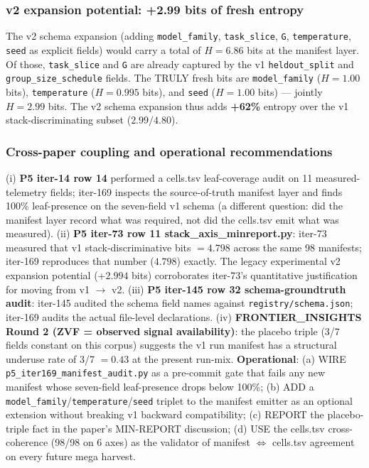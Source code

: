 \subsubsection{v2 expansion potential: +2.99 bits of fresh entropy}
\label{sec:p5-iter169-v2-expansion}

The v2 schema expansion (adding \texttt{model\_family}, \texttt{task\_slice}, \texttt{G}, \texttt{temperature}, \texttt{seed} as explicit fields) would carry a total of $H{=}6.86$ bits at the manifest layer. Of those, \texttt{task\_slice} and \texttt{G} are already captured by the v1 \texttt{heldout\_split} and \texttt{group\_size\_schedule} fields. The TRULY fresh bits are \texttt{model\_family} ($H{=}1.00$ bits), \texttt{temperature} ($H{=}0.995$ bits), and \texttt{seed} ($H{=}1.00$ bits) --- jointly $H{=}2.99$ bits. The v2 schema expansion thus adds \textbf{+62\%} entropy over the v1 stack-discriminating subset ($2.99 / 4.80$).

\subsubsection{Cross-paper coupling and operational recommendations}
\label{sec:p5-iter169-coupling}

(i) \textbf{P5 iter-14 row 14} performed a cells.tsv leaf-coverage audit on 11 measured-telemetry fields; iter-169 inspects the source-of-truth manifest layer and finds 100\% leaf-presence on the seven-field v1 schema (a different question: did the manifest layer record what was required, not did the cells.tsv emit what was measured). (ii) \textbf{P5 iter-73 row 11 stack\_axis\_minreport.py}: iter-73 measured that v1 stack-discriminative bits $= 4.798$ across the same 98 manifests; iter-169 reproduces that number ($4.798$) exactly. The legacy experimental v2 expansion potential (+$2.994$ bits) corroborates iter-73's quantitative justification for moving from v1 $\to$ v2. (iii) \textbf{P5 iter-145 row 32 schema-groundtruth audit}: iter-145 audited the schema field names against \texttt{registry/schema.json}; iter-169 audits the actual file-level declarations. (iv) \textbf{FRONTIER\_INSIGHTS Round 2 (ZVF = observed signal availability)}: the placebo triple (3/7 fields constant on this corpus) suggests the v1 run manifest has a structural underuse rate of 3/7 $= 0.43$ at the present run-mix. \textbf{Operational}: (a) WIRE \texttt{p5\_iter169\_manifest\_audit.py} as a pre-commit gate that fails any new manifest whose seven-field leaf-presence drops below 100\%; (b) ADD a \texttt{model\_family}/\texttt{temperature}/\texttt{seed} triplet to the manifest emitter as an optional extension without breaking v1 backward compatibility; (c) REPORT the placebo-triple fact in the paper's MIN-REPORT discussion; (d) USE the cells.tsv cross-coherence (98/98 on 6 axes) as the validator of manifest $\Leftrightarrow$ cells.tsv agreement on every future mega harvest.
